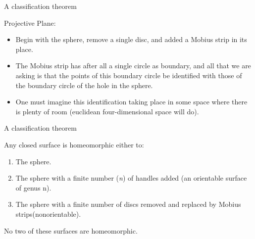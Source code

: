 \documentclass{beamer}
\begin{document}
\begin{frame}{A classification theorem}
  \begin{block}{}
    Projective Plane:
    \begin{itemize}
    \item Begin with the sphere, remove a single disc, and added a Mobius strip in its place.
    \item The Mobius strip has after all a single circle as boundary, and all that we are asking is that the points of this boundary circle be identified with those of the boundary circle of the hole in the sphere.
    \item One must imagine this identification taking place in some space where there is plenty of room (euclidean four-dimensional space will do).
    \end{itemize}
  \end{block}
\end{frame}

\begin{frame}{A classification theorem}
  \begin{theorem}
    Any closed surface is homeomorphic either to:
    \begin{enumerate}[label={(\alph*)}]
    \item The sphere.
    \item The sphere with a finite number (\textsl{n}) of handles added (an orientable surface of genus n).
    \item The sphere with a finite number of discs removed and replaced by Mobius strips(nonorientable).
    \end{enumerate}
    No two of these surfaces are homeomorphic.
  \end{theorem}
\end{frame}
\end{document}
